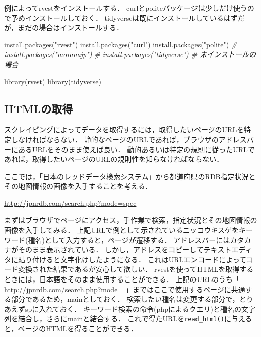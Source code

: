 \documentclass[
]{article}
\newenvironment{Shaded}{\begin{snugshade}}{\end{snugshade}}
\newcommand{\CommentTok}[1]{\textcolor[rgb]{0.56,0.35,0.01}{\textit{#1}}}
\newcommand{\FunctionTok}[1]{\textcolor[rgb]{0.00,0.00,0.00}{#1}}
\newcommand{\NormalTok}[1]{#1}
\newcommand{\StringTok}[1]{\textcolor[rgb]{0.31,0.60,0.02}{#1}}
\begin{document}
例によってrvestをインストールする．
curlとpoliteパッケージは少しだけ使うので予めインストールしておく．
tidyverseは既にインストールしているはずだが，まだの場合はインストールする．

\begin{Shaded}
\begin{Highlighting}[]
\FunctionTok{install.packages}\NormalTok{(}\StringTok{"rvest"}\NormalTok{)}
\FunctionTok{install.packages}\NormalTok{(}\StringTok{"curl"}\NormalTok{)}
\FunctionTok{install.packages}\NormalTok{(}\StringTok{"polite"}\NormalTok{)}
  \CommentTok{\# install.packages("moranajp")}
  \CommentTok{\# install.packages("tidyverse") \# 未インストールの場合}
\end{Highlighting}
\end{Shaded}

\begin{Shaded}
\begin{Highlighting}[]
\FunctionTok{library}\NormalTok{(rvest)}
\FunctionTok{library}\NormalTok{(tidyverse)}
\end{Highlighting}
\end{Shaded}

\hypertarget{htmlux306eux53d6ux5f97}{%
\subsection{HTMLの取得}\label{htmlux306eux53d6ux5f97}}

スクレイピングによってデータを取得するには，取得したいページのURLを特定しなければならない．
静的なページのURLであれば，ブラウザのアドレスバーにあるURLをそのまま使えば良い．
動的あるいは特定の規則に従ったURLであれば，取得したいページのURLの規則性を知らなければならない．

ここでは，「日本のレッドデータ検索システム」から都道府県のRDB指定状況とその地図情報の画像を入手することを考える．

\url{http://jpnrdb.com/search.php?mode=spec}

まずはブラウザでページにアクセス，手作業で検索，指定状況とその地図情報の画像を入手してみる．
上記URLで例として示されているニッコウキスゲをキーワード(種名)として入力すると，ページが遷移する．
アドレスバーにはカタカナがそのまま表示されている．
しかし，アドレスをコピーしてテキストエディタに貼り付けると文字化けしたようになる．
これはURLエンコードによってコード変換された結果であるが安心して欲しい．
rvestを使ってHTMLを取得するときには，日本語をそのまま使用することができる．
上記のURLのうち「 \url{http://jpnrdb.com/search.php?mode=} 」まではここで使用するページに共通する部分であるため，mainとしておく．
検索したい種名は変更する部分で，とりあえずspに入れておく．
キーワード検索の命令(phpによるクエリ)と種名の文字列を結合し，さらにmainと結合する．
これで得たURLを\texttt{read\_html()}に与えると，ページのHTMLを得ることができる．
\end{document}
